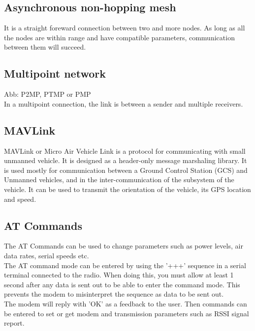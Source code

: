 \subsection{Asynchronous non-hopping mesh}
It is a straight foreward connection between two and more nodes. As long as all the nodes are within range and have compatible parameters, communication between them will succeed.
%
%
\subsection{Multipoint network}
Abb: P2MP, PTMP or PMP\\
In a multipoint connection, the link is between a sender and multiple receivers. 
%
%
\subsection{MAVLink}
MAVLink or Micro Air Vehicle Link is a protocol for communicating with small unmanned vehicle. It is designed as a header-only message marshaling library. It is used mostly for communication between a Ground Control Station (GCS) and Unmanned vehicles, and in the inter-communication of the subsystem of the vehicle. It can be used to transmit the orientation of the vehicle, its GPS location and speed.
%
%
\subsection{AT Commands}
The AT Commands can be used to change parameters such as power levels, air data rates, serial speeds etc. \\
The AT command mode can be entered by using the '+++' sequence in a serial terminal connected to the radio. When doing this, you must allow at least 1 second after any data is sent out to be able to enter the command mode. This prevents the modem to misinterpret the sequence as data to be sent out.\\
The modem will reply with 'OK' as a feedback to the user. Then commands can be entered to set or get modem and transmission parameters such as RSSI signal report.
%
%
